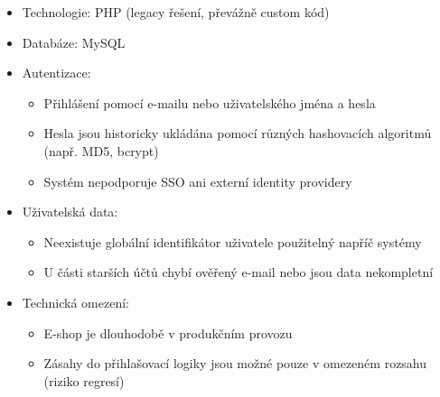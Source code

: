 \documentclass[a4paper,12pt]{article}
\begin{document}
\begin{itemize}

\item Technologie: PHP (legacy řešení, převážně custom kód)\par



\item Databáze: MySQL\par



\item Autentizace:\par

\begin{itemize}

\item Přihlášení pomocí e-mailu nebo uživatelského jména a hesla

\item Hesla jsou historicky ukládána pomocí různých hashovacích algoritmů (např. MD5, bcrypt)

\item Systém nepodporuje SSO ani externí identity providery

\end{itemize}



\item Uživatelská data:\par

\begin{itemize}

\item Neexistuje globální identifikátor uživatele použitelný napříč systémy

\item U části starších účtů chybí ověřený e-mail nebo jsou data nekompletní

\end{itemize}



\item Technická omezení:\par

\begin{itemize}

\item E-shop je dlouhodobě v produkčním provozu

\item Zásahy do přihlašovací logiky jsou možné pouze v omezeném rozsahu (riziko regresí)

\end{itemize}



\end{itemize}
\newpage
\end{document}
